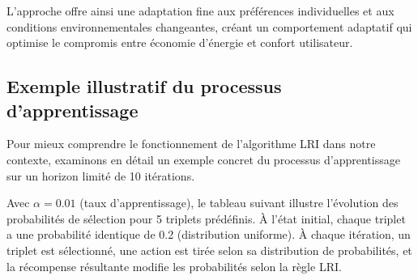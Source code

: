\documentclass[a4paper,11pt]{article}
\begin{document}
L'approche offre ainsi une adaptation fine aux préférences individuelles et aux conditions environnementales changeantes, créant un comportement adaptatif qui optimise le compromis entre économie d'énergie et confort utilisateur.
\newpage
\clearpage
\begin{mdframed}
\subsection*{Exemple illustratif du processus d'apprentissage}
{\small\itshape

Pour mieux comprendre le fonctionnement de l'algorithme LRI dans notre contexte, examinons en détail un exemple concret du processus d'apprentissage sur un horizon limité de 10 itérations.

Avec \(\alpha = 0.01\) (taux d'apprentissage), le tableau suivant illustre l'évolution des probabilités de sélection pour 5 triplets prédéfinis. À l'état initial, chaque triplet a une probabilité identique de 0.2 (distribution uniforme). À chaque itération, un triplet est sélectionné, une action est tirée selon sa distribution de probabilités, et la récompense résultante modifie les probabilités selon la règle LRI.
}


\end{mdframed}
\end{document}
